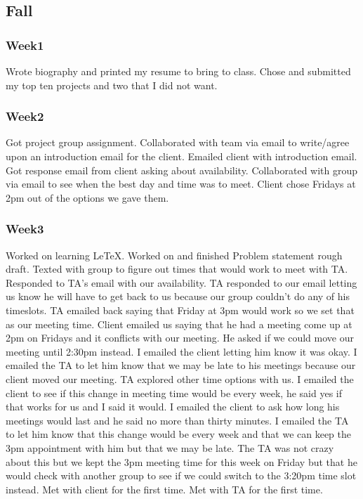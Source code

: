 \subsection*{Fall}
\subsubsection*{Week1}
Wrote biography and printed my resume to bring to class. Chose and submitted my top ten projects and two that I did not want.
\subsubsection*{Week2}
Got project group assignment. Collaborated with team via email to write/agree upon an introduction email for the client. Emailed client with introduction email. Got response email from client asking about availability. Collaborated with group via email to see when the best day and time was to meet. Client chose Fridays at 2pm out of the options we gave them.
\subsubsection*{Week3}
Worked on learning LeTeX. Worked on and finished Problem statement rough draft. Texted with group to figure out times that would work to meet with TA. Responded to TA's email with our availability. TA responded to our email letting us know he will have to get back to us because our group couldn't do any of his timeslots. TA emailed back saying that Friday at 3pm would work so we set that as our meeting time. Client emailed us saying that he had a meeting come up at 2pm on Fridays and it conflicts with our meeting. He asked if we could move our meeting until 2:30pm instead. I emailed the client letting him know it was okay. I emailed the TA to let him know that we may be late to his meetings because our client moved our meeting. TA explored other time options with us. I emailed the client to see if this change in meeting time would be every week, he said yes if that works for us and I said it would. I emailed the client to ask how long his meetings would last and he said no more than thirty minutes. I emailed the TA to let him know that this change would be every week and that we can keep the 3pm appointment with him but that we may be late. The TA was not crazy about this but we kept the 3pm meeting time for this week on Friday but that he would check with another group to see if we could switch to the 3:20pm time slot instead. Met with client for the first time. Met with TA for the first time.
